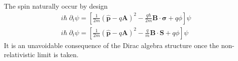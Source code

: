 \documentclass[../../../main.tex]{subfiles}
\begin{document}
The spin naturally occur by design
\begin{align*}
    i\hbar \; \partial_t\psi
    =  \left[\frac{1}{2m}(\mathbf{{\hat{p}}}-q\mathbf{A}) ^{2}-\frac{q \hbar}{2m }\mathbf{B }\cdot  \boldsymbol{\sigma} +q\phi\right]\psi \\
    i\hbar \; \partial_t\psi
    =  \left[\frac{1}{2m}(\mathbf{{\hat{p}}}-q\mathbf{A}) ^{2}-\frac{q }{m }\mathbf{B }\cdot \mathbf{S} +q\phi\right]\psi
\end{align*}
It is an unavoidable consequence of the Dirac algebra structure once the non-relativistic limit is taken.
\end{document}
